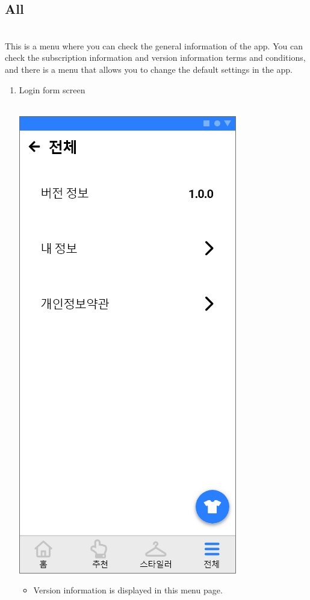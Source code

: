\documentclass[conference]{IEEEtran}
\begin{document}
\subsection {All} \\
This is a menu where you can check the general information of the app. You can check the subscription information and version information terms and conditions, and there is a menu that allows you to change the default settings in the app.
\begin{enumerate}
    \item Login form screen \\ \\
    \centerline{\includegraphics[scale=0.32]{전체.jpg}}
    \begin{itemize}
    \item[] Version information is displayed in this menu page. \\

\end{itemize}
\end{enumerate}
\end{document}
